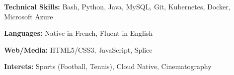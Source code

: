 

\begin{cvparagraph}

\textbf{Technical Skills:} Bash, Python, Java, MySQL, Git, Kubernetes, Docker, Microsoft Azure \hfill

\textbf{Languages:} Native in French, Fluent in English \hfill 

\textbf{Web/Media:} HTML5/CSS3, JavaScript, Splice \hfill 

\textbf{Interets:} Sports (Football, Tennis), Cloud Native, Cinematography \hfill 
\end{cvparagraph}



